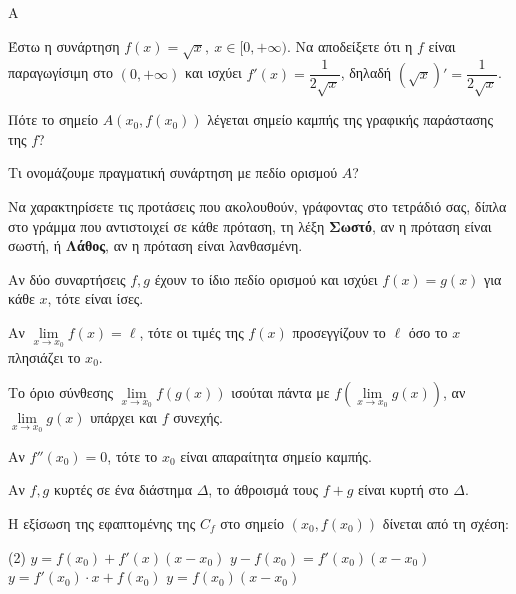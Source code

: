 \begin{thema}{A}
\begin{erwthma}
    \item Έστω η συνάρτηση $ f(x)=\sqrt{x},\ x\in[0,+\infty) $. Να αποδείξετε ότι η $ f $ είναι παραγωγίσιμη στο $ (0,+\infty) $ και ισχύει $ f'(x)=\dfrac{1}{2\sqrt{x}} $, δηλαδή $ \left(\sqrt{x}\right)'=\dfrac{1}{2\sqrt{x}} $.
    \item Πότε το σημείο $A(x_0, f(x_0))$ λέγεται σημείο καμπής της γραφικής παράστασης της $f$?
    \item Τι ονομάζουμε πραγματική συνάρτηση με πεδίο ορισμού $Α$?
    \item Να χαρακτηρίσετε τις προτάσεις που ακολουθούν, γράφοντας στο τετράδιό σας, δίπλα στο γράμμα που αντιστοιχεί σε κάθε πρόταση, τη λέξη \textbf{Σωστό}, αν η πρόταση είναι σωστή, ή \textbf{Λάθος}, αν η πρόταση είναι λανθασμένη.
    \begin{alist}
        \item Αν δύο συναρτήσεις $f, g$ έχουν το ίδιο πεδίο ορισμού και ισχύει $f(x)=g(x)$ για κάθε $x$, τότε είναι ίσες.
        \item Αν $\lim\limits_{x\to x_0} f(x) = \ell$, τότε οι τιμές της $f(x)$ προσεγγίζουν το $\ell$ όσο το $x$ πλησιάζει το $x_0$.
        \item Το όριο σύνθεσης $\lim\limits_{x\to x_0} f(g(x))$ ισούται πάντα με $f(\lim\limits_{x\to x_0} g(x))$, αν $\lim\limits_{x\to x_0} g(x)$ υπάρχει και $f$ συνεχής.
        \item Αν $f''(x_0) = 0$, τότε το $x_0$ είναι απαραίτητα σημείο καμπής.
        \item Αν $f, g$ κυρτές σε ένα διάστημα $\varDelta$, το άθροισμά τους $f+g$ είναι κυρτή στο $\varDelta$.
    \end{alist}
    \item Η εξίσωση της εφαπτομένης της $C_f$ στο σημείο $(x_0, f(x_0))$ δίνεται από τη σχέση:
    \begin{tasks}[label=\let\textdexiakeraia\relax\alph*.](2)
        \task $y = f(x_0) + f'(x)(x - x_0)$
        \task $y - f(x_0) = f'(x_0)(x - x_0)$
        \task $y = f'(x_0) \cdot x + f(x_0)$
        \task $y = f(x_0)(x - x_0)$
    \end{tasks}
\end{erwthma}
\end{thema}
